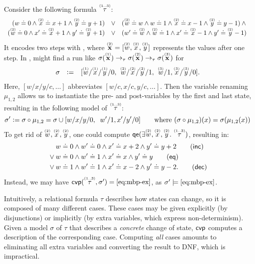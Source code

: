 \begin{example}[$\mbip$]
  \label{ex:projections}
  Consider the following formula $\ind{\tau}{1 \twodots 3}$:
  \small
  \[
    \begin{array}{rcl}
      (w \doteq 0 \land \ind{x}{2} \doteq x + 1 \land \ind{y}{2} \doteq y + 1) & \lor & (\ind{w}{2} \doteq w \land w \doteq 1 \land \ind{x}{2} \doteq x - 1 \land \ind{y}{2} \doteq y - 1) \land {} \\
      (\ind{w}{2} \doteq 0 \land x' \doteq \ind{x}{2} + 1 \land y' \doteq \ind{y}{2} + 1) & \lor & (w' \doteq \ind{w}{2} \land \ind{w}{2} \doteq 1 \land x' \doteq \ind{x}{2} - 1 \land y' \doteq \ind{y}{2} - 1)
    \end{array}
  \]
  \normalsize It encodes two steps with ,
  where $\ind{\vec{x}}{2} = [\ind{w}{2},\ind{x}{2},\ind{y}{2}]$ represents the values after one
  step.
  In ,  might find a run like $\sigma(\ind{\vec{x}}{1}) \to_\tau \sigma(\ind{\vec{x}}{2}) \to_\tau \sigma(\ind{\vec{x}}{3})$ for
  \[
  \begin{array}{rcl@{\;\;}l@{\;\;}l}
  \sigma & \Def  & [\ind{w}{1}/\ind{x}{1}/\ind{y}{1}/0, & \ind{w}{2}/\ind{x}{2}/\ind{y}{2}/1, & \ind{w}{3}/1,\ind{x}{3}/\ind{y}{3}/0].
  \end{array}
  \]
 Here, $[w/x/y/c, \ldots]$ abbreviates $[w/c, x/c, y/c, \ldots]$.
  Then the variable renaming $\mu_{1,2}$ allows us to
instantiate the pre- and post-variables
by the first and last state,
resulting in the following model of
$\ind{\tau}{1 \twodots 3}$:
   \[
    \sigma' \mathrel{\mathop:}= \sigma \circ \mu_{1,2} = \sigma \cup [w/x/y/0,\;\; w'/1,x'/y'/0] \qquad \text{where } (\sigma \circ \mu_{1,2})(x) = \sigma(\mu_{1,2}(x))
  \]
  To get rid of $\ind{w}{2},\ind{x}{2},\ind{y}{2}$, one could compute $\mathsf{qe}(\exists \ind{w}{2},\ind{x}{2},\ind{y}{2}.\ \ind{\tau}{1 \twodots 3})$, resulting in:
  \begin{align}
    & w \doteq 0 \land w' \doteq 0 \land x' \doteq x+2 \land y' \doteq y+2 \tag{\ensuremath{\inc}} \\
    {} \lor {} & w \doteq 0 \land w' \doteq 1 \land x' \doteq x \land y' \doteq y \label{eq:mbp-ex} \tag{\ensuremath{\mathsf{eq}}}\\
    {} \lor {} &w \doteq 1 \land w' \doteq 1 \land x' \doteq x-2 \land y' \doteq y-2. \tag{\ensuremath{\dec}}
  \end{align}
  Instead, we may have $\mbp(\ind{\tau}{1 \twodots 3},\sigma') = \eqref{eq:mbp-ex}$, as
  $\sigma' \models \eqref{eq:mbp-ex}$.
\end{example}
%
Intuitively, a relational formula $\tau$ describes how states can change, so it is composed of many different cases.
%
These cases may be given explicitly (by disjunctions) or implicitly (by
extra variables, which express non-determinism).
%
Given a model $\sigma$ of $\tau$ that describes a \emph{concrete} change of state, $\mbip$ computes a description of the corresponding case.
%
Computing \emph{all} cases amounts to eliminating all extra variables and converting the result to DNF, which is impractical.

